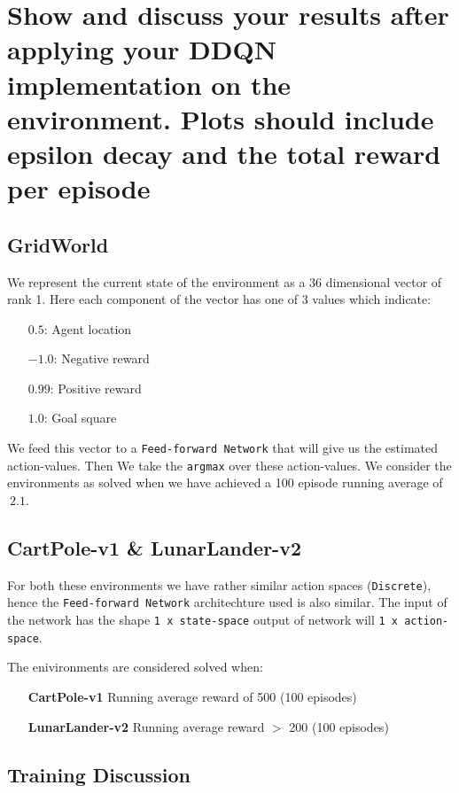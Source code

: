 \documentclass{article} %
\begin{document}
\section{Show and discuss your results after applying your DDQN implementation on the environment.
Plots should include epsilon decay and the total reward per episode}

\subsection{GridWorld}

We represent the current state of the environment as a 36 dimensional vector of rank 1. Here each
component of the vector has one of 3 values which indicate:

\begin{itemize}
    \item[$0.5$:] Agent location
    \item[$-1.0$:] Negative reward
    \item[$0.99$:] Positive reward
    \item[$1.0$:] Goal square
\end{itemize}

We feed this vector to a \verb|Feed-forward Network| that will give us the estimated
action-values. Then We take the \verb|argmax| over these action-values. We consider the
environments as solved when we have achieved a 100 episode running average of $~2.1$.

\subsection{CartPole-v1 \& LunarLander-v2}
For both these environments we have rather similar action spaces (\verb|Discrete|), hence the
\verb|Feed-forward Network| architechture used is also similar. The input of the network has the shape
\verb|1 x state-space| output of network will \verb|1 x action-space|.

The enivironments are considered solved when:
\begin{itemize}
    \item[] \textbf{CartPole-v1} Running average reward of 500 (100 episodes)
    \item[] \textbf{LunarLander-v2} Running average reward $>$ 200 (100 episodes)
\end{itemize}



\subsection{Training Discussion}
\end{document}
